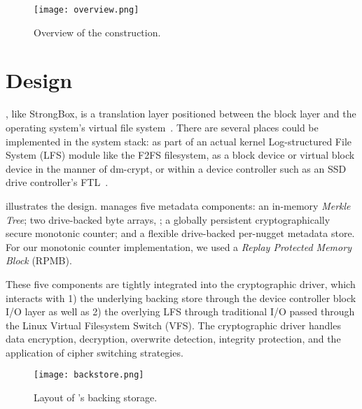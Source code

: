 \begin{figure}[t]
 \centering
  \texttt{[image: overview.png]}
   \caption{Overview of the \SYSTEM{} construction.}\label{fig:overview}
\end{figure}

\section{\SYSTEM{} Design}\label{sec:design}

\SYSTEM{}, like StrongBox, is a translation layer positioned between the block
layer and the operating system's virtual file system~\cite{StrongBox}. There are
several places \SYSTEM{} could be implemented in the system stack: as part of an
actual kernel Log-structured File System (LFS) module like the F2FS filesystem,
as a block device or virtual block device in the manner of dm-crypt, or within a
device controller such as an SSD drive controller's FTL~\cite{StrongBox}.

 illustrates the \SYSTEM{} design. \SYSTEM{} manages five
metadata components: an in-memory \emph{Merkle Tree}; two drive-backed byte
arrays, ; a
globally persistent cryptographically secure monotonic counter; and a flexible
drive-backed per-nugget metadata store. For our monotonic counter
implementation, we used a \emph{Replay Protected Memory Block} (RPMB).

These five components are tightly integrated into the cryptographic driver,
which interacts with 1) the underlying backing store through the device
controller block I/O layer as well as 2) the overlying LFS through traditional
I/O passed through the Linux Virtual Filesystem Switch (VFS). The cryptographic
driver handles data encryption, decryption, overwrite detection, integrity
protection, and the application of cipher switching strategies.


\begin{figure}[t]
 \centering
  \texttt{[image: backstore.png]}
   \caption{Layout of \SYSTEM{}'s backing storage.}\label{fig:backstore}
\end{figure}
